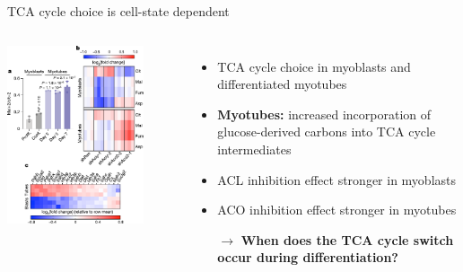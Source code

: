 \documentclass[10pt, aspectratio=169]{beamer}
\begin{document}
\begin{frame}{TCA cycle choice is cell-state dependent}
\begin{columns}			
\centering
\includegraphics[width=0.8\textwidth]{figures/Arnold_2022_fig3_2.pdf}


\begin{itemize}
    \item TCA cycle choice in myoblasts and differentiated myotubes \\[0.2cm]
    \item \textbf{Myotubes:} increased incorporation of glucose-derived carbons into TCA cycle intermediates\\[0.2cm]
    \item ACL inhibition effect stronger in myoblasts\\[0.2cm]
    \item ACO inhibition effect stronger in myotubes\\[0.5cm]
    \pause
    \item[$\rightarrow$] \textbf{When does the TCA cycle switch occur during differentiation?}
\end{itemize}

\end{columns}
\end{frame}
\end{document}
